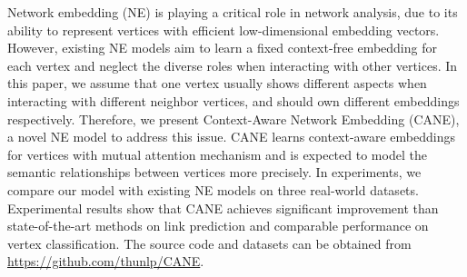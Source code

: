 Network embedding (NE) is playing a critical role in network analysis, due to its ability to represent vertices with efficient low-dimensional embedding vectors. However, existing NE models aim to learn a fixed context-free embedding for each vertex and neglect the diverse roles when interacting with other vertices. In this paper, we assume that one vertex usually shows different aspects when interacting with different neighbor vertices, and should own different embeddings respectively. Therefore, we present Context-Aware Network Embedding (CANE), a novel NE model to address this issue. CANE learns context-aware embeddings for vertices with mutual attention mechanism and is expected to model the semantic relationships between vertices more precisely. In experiments, we compare our model with existing NE models on three real-world datasets. Experimental results show that CANE achieves significant improvement than state-of-the-art methods on link prediction and comparable performance on vertex classification. The source code and datasets can be obtained from \url{https://github.com/thunlp/CANE}.
